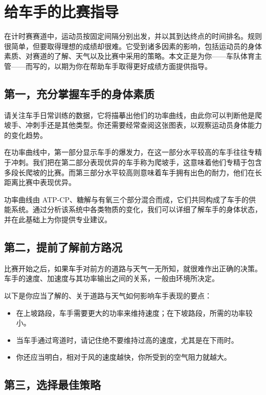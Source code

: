 \documentclass[11pt,a4paper]{ctexart}
\begin{document}
\section*{给车手的比赛指导}

在计时赛赛道中，运动员按固定间隔分别出发，并以其到达终点的时间排名。规则很简单，但要取得理想的成绩却很难。它受到诸多因素的影响，包括运动员的身体素质、对赛道的了解、天气以及比赛中采用的策略。本文正是为你——车队体育主管——而写的，以期为你在帮助车手取得更好成绩方面提供指导。

\subsection*{第一，充分掌握车手的身体素质}

请关注车手日常训练的数据，它将描摹出他们的功率曲线，由此你可以判断他是爬坡手、冲刺手还是其他类型。你还需要经常查阅这张图表，以观察运动员身体能力的变化趋势。

在功率曲线中，第一部分显示车手的爆发力，在这一部分水平较高的车手往往专精于冲刺。我们把在第二部分表现优异的车手称为爬坡手，这意味着他们专精于包含多段长爬坡的比赛。而第三部分水平较高则意味着车手拥有出色的耐力，他们在长距离比赛中表现优异。

功率曲线由 ATP-CP、糖解与有氧三个部分混合而成，它们共同构成了车手的供能系统。通过分析该系统中各类物质的变化，我们可以详细了解车手的身体状态，并在此基础上为你提供专业建议。

\subsection*{第二，提前了解前方路况}

比赛开始之后，如果车手对前方的道路与天气一无所知，就很难作出正确的决策。车手的速度、加速度与其功率输出之间的关系，一般由环境所决定。

以下是你应当了解的、关于道路与天气如何影响车手表现的要点：

\begin{itemize}
\item 在上坡路段，车手需要更大的功率来维持速度；在下坡路段，所需的功率较小。
\item 当车手通过弯道时，请记住绝不要维持过高的速度，尤其是在下雨时。
\item 你还应当明白，相对于风的速度越快，你所受到的空气阻力就越大。
\end{itemize}

\subsection*{第三，选择最佳策略}
\end{document}
